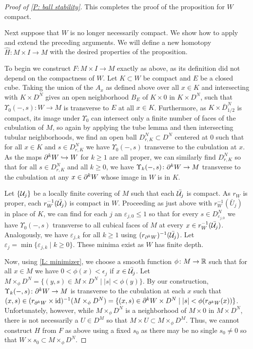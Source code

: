 \begin{proof}[Proof of \cref{P: ball stability}]
	This completes the proof of the proposition for $W$ compact.

	Next suppose that $W$ is no longer necessarily compact.
	We show how to apply and extend the preceding arguments.
	We will define a new homotopy $\hat H \colon M \times I \to M$ with the desired properties of the proposition.

	To begin we construct $F \colon M \times I \to M$ exactly as above, as its definition did not depend on the compactness of $W$.
	Let $K \subset W$ be compact and $E$ be a closed cube.
	Taking the union of the $A_x$ as defined above over all $x \in K$ and intersecting with $K \times D^N$ gives an open neighborhood $B_E$ of $K \times 0$ in $K \times D^N$, such that
	$\Upsilon_0(-,s) \colon W \to M$ is transverse to $E$ at all $x \in K$.
	Furthermore, as $K \times \bar D^N_{1/2}$ is compact, its image under $\Upsilon_0$ can intersect only a finite number of faces of the cubulation of $M$, so again by applying the tube lemma and then intersecting tubular neighborhoods, we find an open ball $D_{r,K}^N \subset D^N$ centered at $0$ such that for all $x \in K$ and $s \in D_{r,K}^N$ we have $\Upsilon_0(-,s)$ transverse to the cubulation at $x$.
	As the maps $\partial^kW \hookrightarrow W$ for $k\geq 1$ are all proper, we can similarly find $D_{r,K}^N$ so that for all $s \in D_{r,K}^N$ and all $k\geq 0$, we have $\Upsilon_k(-,s) \colon \partial^kW \to M$ transverse to the cubulation at any $x \in \partial^{k}W$ whose image in $W$ is in $K$.

	Let $\{\mathcal{U}_j\}$ be a locally finite covering of $M$ such that each $\bar{\mathcal{U}_j}$ is compact.
	As $r_W$ is proper, each $r^{-1}_W(\bar {\mathcal{U}_j})$ is compact in $W$.
	Proceeding as just above with $r_W^{-1}(\bar U_j)$ in place of $K$, we can find for each $j$ an $\varepsilon_{j,0} \leq 1$ so that for every $s \in D^N_{\varepsilon_{j,0}}$ we have $\Upsilon_0(-,s)$ transverse to all cubical faces of $M$ at every $x \in r^{-1}_W(\bar {\mathcal{U}_j})$.
	Analogously, we have $\varepsilon_{j,k}$ for all $k\geq 1$ using $(r_{\partial^k W})^{-1}(\bar {\mathcal{U}_j})$.
	Let $\varepsilon_j = \min\{\varepsilon_{j,k} \mid k\geq 0\}$.
	These minima exist as $W$ has finite depth.

	Now, using \cref{L: minimizer}, we choose a smooth function $\phi \colon M \to \mathbb{R}$ such that for all $x \in M$ we have $0<\phi(x)<\epsilon_j$ if $x \in \bar{\mathcal{U}_j}$.
	Let $M\times_\phi D^N = \{(y,s) \in M \times D^N \mid |s|<\phi(y)\}$.
	By our construction, $\Upsilon_k(-,s) \colon \partial^{k}W \to M$ is transverse to the cubulation at each $x$ such that $(x,s)\in(r_{\partial^{k}W} \times \mathrm{id})^{-1}(M\times_\phi D^N) = \{(x,s) \in \partial^{k}W \times D^N \mid |s|<\phi(r_{\partial^kW}(x))\}$.
	Unfortunately, however, while $M\times_\phi D^N$ is a neighborhood of $M \times 0$ in $M \times D^N$, there is not necessarily a $U \in D^M$ so that $M \times U \subset M\times_\phi D^M$.
	Thus,
	we cannot construct $H$ from $F$ as above using a fixed $s_0$ as there may be no single $s_0\neq 0$ so that $W \times s_0 \subset M\times_\phi D^N$.


\end{proof}
